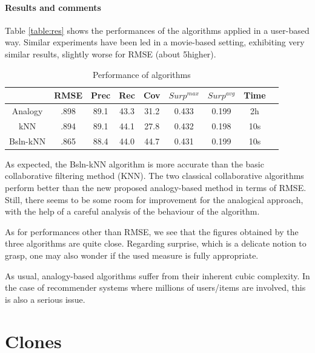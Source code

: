 \paragraph{Results and comments\\}

Table \ref{table:res} shows the performances of the algorithms applied in a
user-based way. Similar experiments have been led in a movie-based setting, exhibiting
very similar results, slightly worse for RMSE (about 5\permil higher).

\begin{table}[ht]
\begin{tabular}{| c || c | c | c | c | c | c | c | c |}
\hline
& RMSE & Prec & Rec & Cov & $Surp^{max}$ & $Surp^{avg}$ & Time \\
\hline
Analogy   & .898 & 89.1 & 43.3 & 31.2 & 0.433 & 0.199 & 2h \\
kNN     & .894 & 89.1 & 44.1 & 27.8 & 0.432 & 0.198 & 10s \\
Bsln-kNN & .865 & 88.4 & 44.0 & 44.7 & 0.431 & 0.199 & 10s \\
\hline
\end{tabular}

\caption{Performance of algorithms}
  \label{Zob}
\end{table}

As expected, the Bsln-kNN algorithm is more accurate than the basic
collaborative filtering method (KNN). The two classical collaborative
algorithms perform better than the new proposed analogy-based method in terms
of RMSE. Still, there seems to be some room for improvement for the analogical
approach, with the help of a careful analysis of the behaviour of the
algorithm.

As for performances other than RMSE, we see that the figures obtained by the
three algorithms are quite close. Regarding surprise, which is a delicate
notion to grasp, one may also wonder if the used measure is fully appropriate.

As usual, analogy-based algorithms suffer from their inherent cubic complexity.
In the case of recommender systems where millions of users/items are involved,
this is also a serious issue.

\section{Clones}

